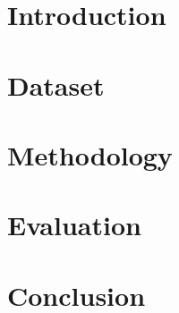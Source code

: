 \documentclass[10pt,sigconf]{acmart}
\begin{document}

\maketitle

\section{Introduction}


\section{Dataset}



\section{Methodology}



\section{Evaluation}


\section{Conclusion}




 
\end{document}
